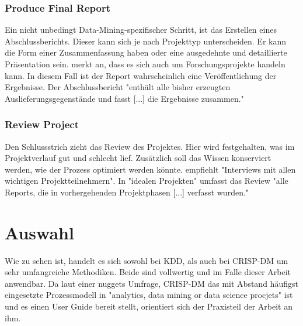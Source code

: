 \subsubsection{Produce Final Report}
Ein nicht unbedingt Data-Mining-spezifischer Schritt, ist das Erstellen eines Abschlussberichts. Dieser kann sich je nach Projekttyp unterscheiden. Er kann die Form einer Zusammenfassung haben oder eine ausgedehnte und detaillierte Präsentation sein. \citep[Punkt 1.4.1.1]{larose_discovering_2014} merkt an, dass es sich auch um Forschungsprojekte handeln kann. In diesem Fall ist der Report wahrscheinlich eine Veröffentlichung der Ergebnisse. Der Abschlussbericht "enthält alle bisher erzeugten Auslieferungsgegenstände und fasst [...] die Ergebnisse zusammen."\citep[S~18; eigene Übersetzung]{shearer_crisp-dm_2000}

\subsubsection{Review Project}
Den Schlussstrich zieht das Review des Projektes. Hier wird festgehalten, was im Projektverlauf gut und schlecht lief. Zusätzlich soll das Wissen konserviert werden, wie der Prozess optimiert werden könnte.
\citep[S.~18; eigene Übersetzung]{shearer_crisp-dm_2000} empfiehlt "Interviews mit allen wichtigen Projektteilnehmern". In "idealen Projekten" umfasst das Review "alle Reports, die in vorhergehenden Projektphasen [...] verfasst wurden."\citep[S.~29; eigene Übersetzung]{chapman_crisp-dm_2000}

\section{Auswahl}\label{sec:crispdmdec}
Wie zu sehen ist, handelt es sich sowohl bei KDD, als auch bei CRISP-DM um sehr umfangreiche Methodiken. Beide sind vollwertig und im Falle dieser Arbeit anwendbar. Da laut einer \gls{nuggets} Umfrage, CRISP-DM das mit Abstand häufigst eingesetzte Prozessmodell in "analytics, data mining or data science procjets" ist \citep{piatetsky_crisp-dm_2014} und es einen User Guide bereit stellt\citep[S.~7]{chapman_crisp-dm_2000}, orientiert sich der Praxisteil der Arbeit an ihm.



